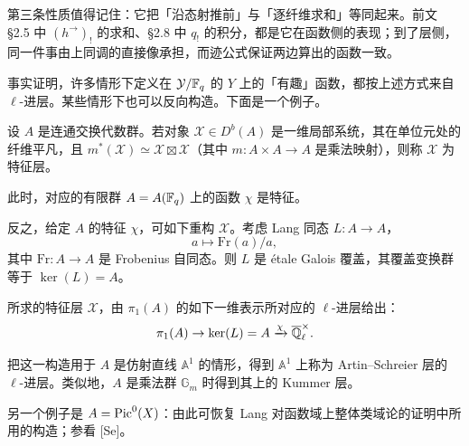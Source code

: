 \begin{annote}
第三条性质值得记住：它把「沿态射推前」与「逐纤维求和」等同起来。前文 \S2.5 中 $(h^{\rightarrow})_!$ 的求和、\S2.8 中 $q_!$ 的积分，都是它在函数侧的表现；到了层侧，同一件事由上同调的直接像承担，而迹公式保证两边算出的函数一致。\par\vspace{0.15em}{\raggedleft 【来源：原书 \S4.2（A）；Grothendieck--Lefschetz 迹公式的标准表述（B）】\par}
\end{annote}

事实证明，许多情形下定义在 $\mathcal{Y}/\mathbb{F}_q$ 的 $Y$ 上的「有趣」函数，都按上述方式来自 $\ell$-进层。某些情形下也可以反向构造。下面是一个例子。

设 $A$ 是连通交换代数群。若对象 $\mathcal{X}\in D^b(A)$ 是一维局部系统，其在单位元处的纤维平凡，且 $m^*(\mathcal{X})\simeq\mathcal{X}\boxtimes\mathcal{X}$（其中 $m:A\times A\to A$ 是乘法映射），则称 $\mathcal{X}$ 为特征层。

此时，对应的有限群 $A=A(\mathbb{F}_q)$ 上的函数 $\chi$ 是特征。

反之，给定 $A$ 的特征 $\chi$，可如下重构 $\mathcal{X}$。考虑 Lang 同态 $L:A\to A$，
\[
a\mapsto\mathrm{Fr}(a)/a,
\]
其中 $\mathrm{Fr}:A\to A$ 是 Frobenius 自同态。则 $L$ 是 \'etale Galois 覆盖，其覆盖变换群等于 $\ker(L)=A$。

所求的特征层 $\mathcal{X}$，由 $\pi_1(A)$ 的如下一维表示所对应的 $\ell$-进层给出：
\[
\pi_1(A)\to\ker(L)=A\xrightarrow{\chi}\overline{\mathbb{Q}}_\ell^\times .
\]

把这一构造用于 $A$ 是仿射直线 $\mathbb{A}^1$ 的情形，得到 $\mathbb{A}^1$ 上称为 Artin--Schreier 层的 $\ell$-进层。类似地，$A$ 是乘法群 $\mathbb{G}_m$ 时得到其上的 Kummer 层。

另一个例子是 $A=\operatorname{Pic}^0(X)$：由此可恢复 Lang 对函数域上整体类域论的证明中所用的构造；参看 [Se]。
